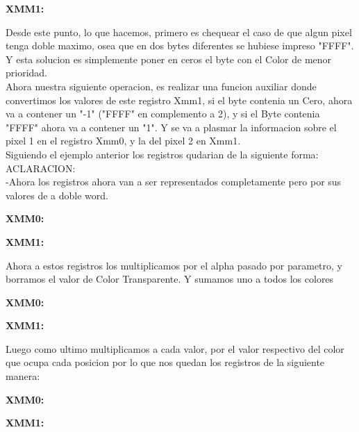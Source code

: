 \par{\textbf{XMM1:}}

\qquad 	Desde este punto, lo que hacemos, primero es chequear el caso de que algun pixel tenga doble maximo, osea que en dos bytes diferentes se hubiese impreso "FFFF". Y esta solucion es simplemente poner en ceros el byte con el Color de menor prioridad. \\       Ahora  nuestra siguiente operacion, es realizar una funcion auxiliar donde convertimos los valores de este registro Xmm1, si el byte contenia un Cero, ahora va a contener un "-1" ("FFFF" en complemento a 2), y si el Byte contenia "FFFF" ahora va a contener un "1". Y se va a plasmar la informacion sobre el pixel 1 en el registro Xmm0, y la del pixel 2 en Xmm1.\\  Siguiendo el ejemplo anterior los registros qudarian de la siguiente forma:\\  	 ACLARACION: \\ -Ahora los registros ahora van a ser representados completamente pero por sus valores de a doble word. 

\par{\textbf{XMM0:}}

\par{\textbf{XMM1:}}

\par{}
\par{Ahora a estos registros los multiplicamos por el alpha pasado por parametro, y borramos el valor de Color Transparente. Y sumamos uno a todos los colores}
\par{}

\par{\textbf{XMM0:}}

\par{\textbf{XMM1:}}


	Luego como ultimo multiplicamos a cada valor, por el valor respectivo del color que ocupa cada posicion por lo que nos quedan los registros de la siguiente manera:

\par{\textbf{XMM0:}}

\par{\textbf{XMM1:}}
	
